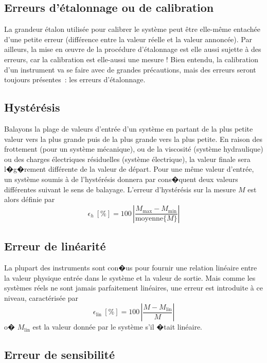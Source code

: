 \subsection{Erreurs d'étalonnage ou de calibration}

La grandeur étalon utilisée pour calibrer le système peut être elle-même entachée d'une petite erreur (différence entre la valeur réelle et la valeur annoncée). Par ailleurs, la mise en \oe uvre de la procédure d'étalonnage est elle aussi sujette à des erreurs, car la calibration est elle-aussi une mesure ! Bien entendu, la calibration d'un instrument va se faire avec de grandes précautions, mais des erreurs seront toujours présentes~: les erreurs d'étalonnage.

\subsection{Hystérésis}

Balayons la plage de valeurs d'entrée d'un système en partant de la plus petite valeur vers la plus grande puis de la plus grande vers la plus petite. En raison des frottement (pour un système mécanique), ou de la viscosité (système hydraulique) ou des charges électriques résiduelles (système électrique), la valeur finale sera l�g�rement différente de la valeur de départ. Pour une même valeur d'entrée, un système soumis à de l'hystérésis donnera par cons�quent deux valeurs différentes suivant le sens de balayage. L'erreur d'hystérésis sur la mesure $M$ est alors définie par
$$
\epsilon_h\ [\%]=100\,\left|\frac{M_{\text{max}}-M_{\text{min}}}{\text{moyenne}\{M\}}\right|
$$

\subsection{Erreur de linéarité}

La plupart des instruments sont con�us pour fournir une relation linéaire entre la valeur physique entrée dans le système et la valeur de sortie. Mais comme les systèmes réels ne sont jamais parfaitement linéaires, une erreur est introduite à ce niveau, caractérisée par
$$
\epsilon_\text{lin}\ [\%]=100\,\left|\frac{M-M_{\text{lin}}}{M}\right|
$$
o� $M_{\text{lin}}$ est la valeur donnée par le système s'il �tait linéaire.

\subsection{Erreur de sensibilité}

